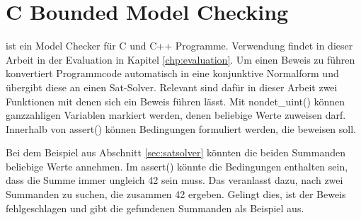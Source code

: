 \section{C Bounded Model Checking}
\label{sec:cbmc}

 ist ein Model Checker für C und C++ Programme. Verwendung findet  in dieser Arbeit in der Evaluation in Kapitel \ref{chp:evaluation}.
Um einen Beweis zu führen konvertiert  Programmcode automatisch in eine konjunktive Normalform und übergibt diese an einen Sat-Solver.
Relevant sind dafür in dieser Arbeit zwei Funktionen mit denen sich ein Beweis führen lässt. Mit nondet\_uint() können ganzzahligen Variablen markiert
werden, denen  beliebige Werte zuweisen darf. Innerhalb von assert() können Bedingungen formuliert werden, die  beweisen soll.

Bei dem Beispiel aus Abschnitt \ref{sec:satsolver} könnten die beiden Summanden beliebige Werte annehmen. Im assert() könnte die Bedingungen enthalten sein,
dass die Summe immer ungleich 42 sein muss. Das veranlasst  dazu, nach zwei Summanden zu suchen, die zusammen 42 ergeben. Gelingt dies, ist der
Beweis fehlgeschlagen und  gibt die gefundenen Summanden als Beispiel aus.
